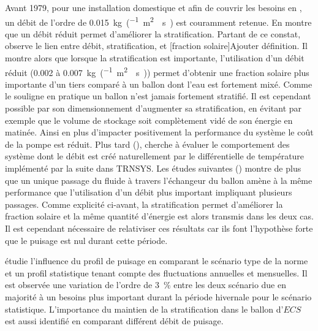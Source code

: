 Avant 1979, pour une installation domestique et afin de couvrir les besoins
en , un débit de l’ordre de \SI{0.015}{kg\per(\metre\squared\period\second)}
est couramment retenue. En  montre que un débit réduit
permet d’améliorer la stratification. Partant de ce constat, 
observe le lien entre débit, stratification, et [fraction solaire]{Ajouter définition}.
Il montre alors que lorsque la stratification est importante, l’utilisation d’un débit
réduit (\num{0.002} à \SI{0.007}{kg\per(\metre\squared\period\second)}) permet
d’obtenir une fraction solaire plus importante d’un tiers comparé à un ballon dont
l’eau est fortement mixé. Comme le souligne  en pratique
un ballon n’est jamais fortement stratifié. Il est cependant possible par son dimensionnement
d’augmenter sa stratification, en évitant par exemple que le volume de stockage soit
complètement vidé de son énergie en matinée. Ainsi en plus d’impacter positivement
la performance du système le coût de la pompe est réduit. Plus tard (),
cherche à évaluer le comportement des système dont le débit est créé naturellement
par le différentielle de température implémenté par la suite dans TRNSYS. Les études
suivantes () montre de plus que un unique
passage du fluide à travers l’échangeur du ballon amène à la même performance que
l’utilisation d’un débit plus important impliquant plusieurs passages. Comme explicité
ci-avant, la stratification permet d’améliorer la fraction solaire et la même
quantité d’énergie est alors transmis dans les deux cas. Il est cependant nécessaire de relativiser ces
résultats car ils font l’hypothèse forte que le puisage est nul durant cette période.

\textcite{Jordan2001197} étudie l’influence du profil de puisage en comparant le
scénario type de la norme  et un profil statistique tenant compte
des fluctuations annuelles et mensuelles. Il est observée une variation de l’ordre
de \SI{3}{\percent} entre les deux scénario due en majorité à un besoins plus
important durant la période hivernale pour le scénario statistique.
L’importance du maintien de la stratification dans le ballon d’$ECS$ est aussi identifié
en comparant différent débit de puisage.



